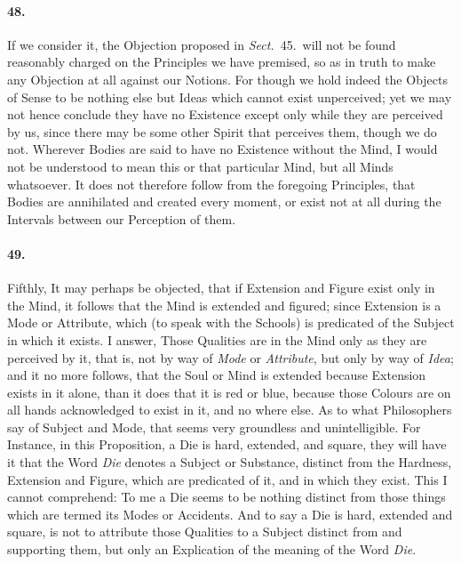 \documentclass[]{article}
\newenvironment{sectionbody}{}{}
\begin{document}
\begin{sectionbody}
\paragraph{48.} If we consider it, the Objection proposed in
\emph{Sect.}~45.\ will not be found reasonably charged on the
Principles we have
premised, so as in truth to make any Objection at all against our
Notions.  For though we hold indeed the Objects of Sense to be
nothing else but Ideas which cannot exist unperceived; yet we may
not hence conclude they have no Existence except only while they
are perceived by us, since there may be some other Spirit that
perceives them, though we do not.  Wherever Bodies are said to
have no Existence without the Mind, I would not be understood to
mean this or that particular Mind, but all Minds whatsoever.  It
does not therefore follow from the foregoing Principles, that
Bodies are annihilated and created every moment, or exist not at
all during the Intervals between our Perception of them.



\paragraph{49.} Fifthly, It may perhaps be objected, that if Extension and Figure
exist only in the Mind, it follows that the Mind is extended and
figured; since Extension is a Mode or Attribute, which (to speak
with the Schools) is predicated of the Subject in which it
exists.  I answer, Those Qualities are in the Mind only as they
are perceived by it, that is, not by way of \emph{Mode} or
\emph{Attribute}, but only by way of \emph{Idea}; and it no
more follows, that the Soul or Mind is extended because Extension
exists in it alone, than it does that it is red or blue, because
those Colours are on all hands acknowledged to exist in it, and
no where else.  As to what Philosophers say of Subject and Mode,
that seems very groundless and unintelligible.  For Instance, in
this Proposition, a Die is hard, extended, and square, they will
have it that the Word \emph{Die} denotes a Subject or
Substance, distinct from the Hardness, Extension and Figure,
which are predicated of it, and in which they exist.  This I
cannot comprehend: To me a Die seems to be nothing distinct from
those things which are termed its Modes or Accidents.  And to
say a Die is hard, extended and square, is not to attribute those
Qualities to a Subject distinct from and supporting them, but
only an Explication of the meaning of the Word \emph{Die}.




\end{sectionbody}
\end{document}
